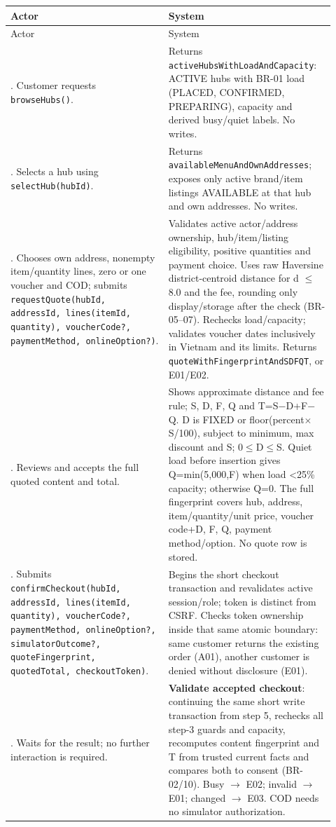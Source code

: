 \begin{longtable}{>{\raggedright\arraybackslash}p{0.4600\linewidth}>{\raggedright\arraybackslash}p{0.4600\linewidth}}
Actor & System \\
\hline\endfirsthead
Actor & System \\
\hline\endhead
1. Customer requests \texttt{browseHubs()}. & Returns \texttt{activeHubsWithLoadAndCapacity}: ACTIVE hubs with BR-01 load (PLACED, CONFIRMED, PREPARING), capacity and derived busy/quiet labels. No writes. \\
2. Selects a hub using \texttt{selectHub(hubId)}. & Returns \texttt{availableMenuAndOwnAddresses}; exposes only active brand/item listings AVAILABLE at that hub and own addresses. No writes. \\
3. Chooses own address, nonempty item/quantity lines, zero or one voucher and COD; submits \texttt{requestQuote(hubId, addressId, lines(itemId, quantity), voucherCode?, paymentMethod, onlineOption?)}. & Validates active actor/address ownership, hub/item/listing eligibility, positive quantities and payment choice. Uses raw Haversine district-centroid distance for d \ensuremath{\leq} 8.0 and the fee, rounding only display/storage after the check (BR-05--07). Rechecks load/capacity; validates voucher dates inclusively in Vietnam and its limits. Returns \texttt{quoteWithFingerprintAndSDFQT}, or E01/E02. \\
4. Reviews and accepts the full quoted content and total. & Shows approximate distance and fee rule; S, D, F, Q and T=S\ensuremath{-}D+F\ensuremath{-}Q. D is FIXED or floor(percent\ensuremath{\times}S/100), subject to minimum, max discount and S; 0\ensuremath{\leq}D\ensuremath{\leq}S. Quiet load before insertion gives Q=min(5,000,F) when load \textless{}25\% capacity; otherwise Q=0. The full fingerprint covers hub, address, item/quantity/unit price, voucher code+D, F, Q, payment method/option. No quote row is stored. \\
5. Submits \texttt{confirmCheckout(hubId, addressId, lines(itemId, quantity), voucherCode?, paymentMethod, onlineOption?, simulatorOutcome?, quoteFingerprint, quotedTotal, checkoutToken)}. & Begins the short checkout transaction and revalidates active session/role; token is distinct from CSRF. Checks token ownership inside that same atomic boundary: same customer returns the existing order (A01), another customer is denied without disclosure (E01). \\
6. Waits for the result; no further interaction is required. & \textbf{Validate accepted checkout}: continuing the same short write transaction from step 5, rechecks all step-3 guards and capacity, recomputes content fingerprint and T from trusted current facts and compares both to consent (BR-02/10). Busy \ensuremath{\rightarrow} E02; invalid \ensuremath{\rightarrow} E01; changed \ensuremath{\rightarrow} E03. COD needs no simulator authorization. \\

\end{longtable}
